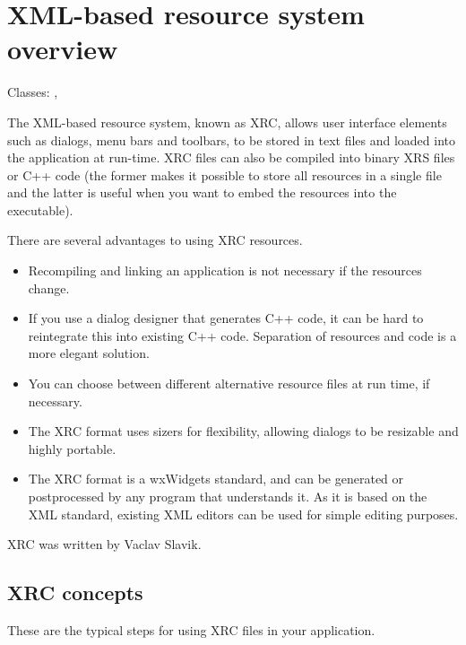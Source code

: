 %
\section{XML-based resource system overview}\label{xrcoverview}

Classes: , 

The XML-based resource system, known as XRC, allows user interface elements such as
dialogs, menu bars and toolbars, to be stored in text files and loaded into
the application at run-time. XRC files can also be compiled into binary XRS files or C++
code (the former makes it possible to store all resources in a single file and the latter
is useful when you want to embed the resources into the executable).

There are several advantages to using XRC resources.

\begin{itemize}\itemsep=0pt
\item Recompiling and linking an application is not necessary if the
resources change.
\item If you use a dialog designer that generates C++ code, it can be hard
to reintegrate this into existing C++ code. Separation of resources and code
is a more elegant solution.
\item You can choose between different alternative resource files at run time, if necessary.
\item The XRC format uses sizers for flexibility, allowing dialogs to be resizable
and highly portable.
\item The XRC format is a wxWidgets standard,
and can be generated or postprocessed by any program that understands it. As it is based
on the XML standard, existing XML editors can be used for simple editing purposes.
\end{itemize}

XRC was written by Vaclav Slavik.

\subsection{XRC concepts}\label{xrcconcepts}

These are the typical steps for using XRC files in your application.

